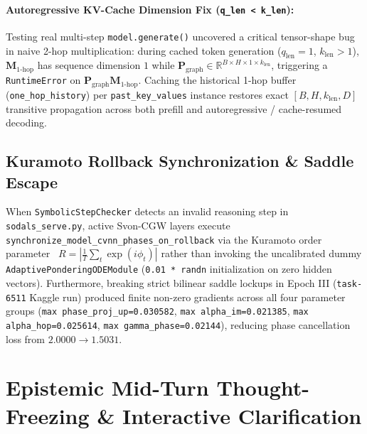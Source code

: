 \documentclass[11pt,a4paper]{article}
\begin{document}
\paragraph{Autoregressive KV-Cache Dimension Fix (\texttt{q\_len < k\_len}):}
Testing real multi-step \texttt{model.generate()} uncovered a critical tensor-shape bug in naive 2-hop multiplication: during cached token generation ($q_{\text{len}} = 1$, $k_{\text{len}} > 1$), $\mathbf{M}_{1\text{-hop}}$ has sequence dimension $1$ while $\mathbf{P}_{\text{graph}} \in \mathbb{R}^{B \times H \times 1 \times k_{\text{len}}}$, triggering a \texttt{RuntimeError} on $\mathbf{P}_{\text{graph}} \mathbf{M}_{1\text{-hop}}$. Caching the historical 1-hop buffer (\texttt{one\_hop\_history}) per \texttt{past\_key\_values} instance restores exact $[B, H, k_{\text{len}}, D]$ transitive propagation across both prefill and autoregressive / cache-resumed decoding.

\subsection{Kuramoto Rollback Synchronization \& Saddle Escape}
When \texttt{SymbolicStepChecker} detects an invalid reasoning step in \texttt{sodals\_serve.py}, active Svon-CGW layers execute \texttt{synchronize\_model\_cvnn\_phases\_on\_rollback} via the Kuramoto order parameter~\cite{kuramoto1975} $R = |\frac{1}{T}\sum_t \exp(i\phi_t)|$ rather than invoking the uncalibrated dummy \texttt{AdaptivePonderingODEModule} (\texttt{0.01 * randn} initialization on zero hidden vectors). Furthermore, breaking strict bilinear saddle lockups in Epoch III (\texttt{task-6511} Kaggle run) produced finite non-zero gradients across all four parameter groups (\texttt{max phase\_proj\_up=0.030582}, \texttt{max alpha\_im=0.021385}, \texttt{max alpha\_hop=0.025614}, \texttt{max gamma\_phase=0.02144}), reducing phase cancellation loss from $2.0000 \to 1.5031$.

\section{Epistemic Mid-Turn Thought-Freezing \& Interactive Clarification}
\end{document}
